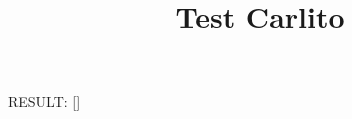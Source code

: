 \documentclass{scrartcl}
\title{Test Carlito}
\begin{document}
RESULT: [\hussongetfooterleft]
\end{document}
